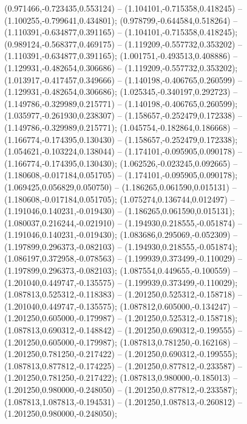  (0.971466,-0.723435,0.553124) -- (1.104101,-0.715358,0.418245) -- (1.100255,-0.799641,0.434801);
 (0.978799,-0.644584,0.518264) -- (1.110391,-0.634877,0.391165) -- (1.104101,-0.715358,0.418245);
 (0.989124,-0.568377,0.469175) -- (1.119209,-0.557732,0.353202) -- (1.110391,-0.634877,0.391165);
 (1.001751,-0.493513,0.408886) -- (1.129931,-0.482654,0.306686) -- (1.119209,-0.557732,0.353202);
 (1.013917,-0.417457,0.349666) -- (1.140198,-0.406765,0.260599) -- (1.129931,-0.482654,0.306686);
 (1.025345,-0.340197,0.292723) -- (1.149786,-0.329989,0.215771) -- (1.140198,-0.406765,0.260599);
 (1.035977,-0.261930,0.238307) -- (1.158657,-0.252479,0.172338) -- (1.149786,-0.329989,0.215771);
 (1.045754,-0.182864,0.186668) -- (1.166774,-0.174395,0.130430) -- (1.158657,-0.252479,0.172338);
 (1.054621,-0.103224,0.138044) -- (1.174101,-0.095905,0.090178) -- (1.166774,-0.174395,0.130430);
 (1.062526,-0.023245,0.092665) -- (1.180608,-0.017184,0.051705) -- (1.174101,-0.095905,0.090178);
 (1.069425,0.056829,0.050750) -- (1.186265,0.061590,0.015131) -- (1.180608,-0.017184,0.051705);
 (1.075274,0.136744,0.012497) -- (1.191046,0.140231,-0.019430) -- (1.186265,0.061590,0.015131);
 (1.080037,0.216244,-0.021910) -- (1.194930,0.218555,-0.051874) -- (1.191046,0.140231,-0.019430);
 (1.083686,0.295069,-0.052309) -- (1.197899,0.296373,-0.082103) -- (1.194930,0.218555,-0.051874);
 (1.086197,0.372958,-0.078563) -- (1.199939,0.373499,-0.110029) -- (1.197899,0.296373,-0.082103);
 (1.087554,0.449655,-0.100559) -- (1.201040,0.449747,-0.135575) -- (1.199939,0.373499,-0.110029);
 (1.087813,0.525312,-0.118383) -- (1.201250,0.525312,-0.158718) -- (1.201040,0.449747,-0.135575);
 (1.087812,0.605000,-0.134247) -- (1.201250,0.605000,-0.179987) -- (1.201250,0.525312,-0.158718);
 (1.087813,0.690312,-0.148842) -- (1.201250,0.690312,-0.199555) -- (1.201250,0.605000,-0.179987);
 (1.087813,0.781250,-0.162168) -- (1.201250,0.781250,-0.217422) -- (1.201250,0.690312,-0.199555);
 (1.087813,0.877812,-0.174225) -- (1.201250,0.877812,-0.233587) -- (1.201250,0.781250,-0.217422);
 (1.087813,0.980000,-0.185013) -- (1.201250,0.980000,-0.248050) -- (1.201250,0.877812,-0.233587);
 (1.087813,1.087813,-0.194531) -- (1.201250,1.087813,-0.260812) -- (1.201250,0.980000,-0.248050);
